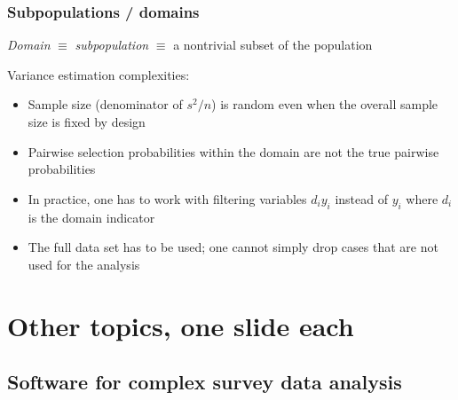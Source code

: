 \documentclass{beamer}
\begin{document}
\begin{frame}\frametitle{Subpopulations / domains}

\textit{Domain} $\equiv$ \textit{subpopulation} $\equiv$ a nontrivial subset of the population

\bigskip

Variance estimation complexities:
\begin{itemize}
    \item Sample size (denominator of $s^2/n$) is random even when the overall sample size is fixed by design
    \item Pairwise selection probabilities within the domain are not the true pairwise probabilities
    \item In practice, one has to work with filtering variables $d_i y_i$ instead of $y_i$ where
        $d_i$ is the domain indicator
    \item The full data set has to be used; one cannot simply drop cases that are not used for the analysis
\end{itemize}

\citet{west:berglund:heeringa:2008}

\end{frame}

\section{Other topics, one slide each}

\subsection{Software for complex survey data analysis}
\end{document}
